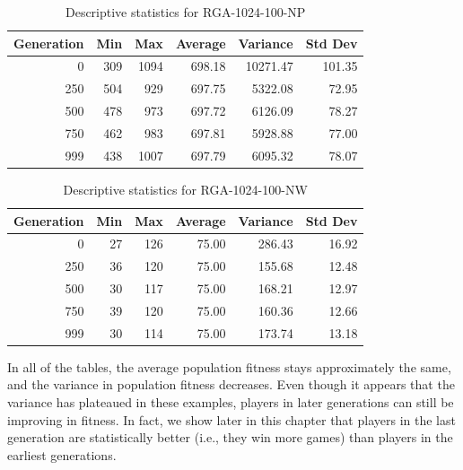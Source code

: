 \begin{table}[ht]
\begin{center}
\caption[RGA-1024-100-NP statistics]{Descriptive statistics for RGA-1024-100-NP}
\begin{tabular}{ | r || r | r | r | r | r |}
\hline
Generation & Min & Max & Average & Variance & Std Dev \\ \hline \hline
0   & 309 & 1094 & 698.18 &  10271.47 & 101.35 \\ \hline
250 & 504 &  929 & 697.75 &   5322.08 &  72.95 \\ \hline
500 & 478 &  973 & 697.72 &   6126.09 &  78.27 \\ \hline
750 & 462 &  983 & 697.81 &   5928.88 &  77.00 \\ \hline
999 & 438 & 1007 & 697.79 &   6095.32 &  78.07 \\ \hline
\end{tabular}
\label{table-stats-for-s1024-n100-np}
\end{center}
\end{table}

\begin{table}[ht]
\begin{center}
\caption[RGA-1024-100-NW statistics]{Descriptive statistics for RGA-1024-100-NW}
\begin{tabular}{ | r || r | r | r | r | r |}
\hline
Generation & Min & Max & Average & Variance & Std Dev \\ \hline \hline
0   & 27 & 126 & 75.00 & 286.43 & 16.92 \\ \hline
250 & 36 & 120 & 75.00 & 155.68 & 12.48 \\ \hline
500 & 30 & 117 & 75.00 & 168.21 & 12.97 \\ \hline
750 & 39 & 120 & 75.00 & 160.36 & 12.66 \\ \hline
999 & 30 & 114 & 75.00 & 173.74 & 13.18 \\ \hline
\end{tabular}
\label{table-stats-for-s1024-n100-nw}
\end{center}
\end{table}

In all of the tables, the average population fitness stays approximately
the same, and the variance in population fitness decreases. Even though it
appears that the variance has plateaued in these examples, players in later
generations can still be improving in fitness. In fact, we show later in this
chapter that players in the last generation are statistically better (i.e., they
win more games) than players in the earliest generations.

